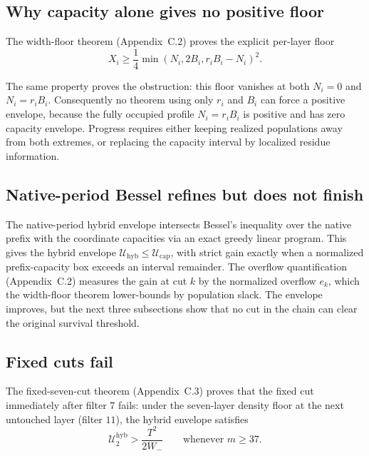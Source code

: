 \subsection{Why capacity alone gives no positive floor}
\label{sec:capacity-no-positive-floor}

The width-floor theorem (Appendix~C.2) proves the explicit per-layer floor
\begin{equation*}
X_i\ge\frac14\min(N_i,2B_i,r_iB_i-N_i)^2.
\end{equation*}

The same property proves the obstruction: this floor vanishes at both
$N_i=0$ and $N_i=r_iB_i$. Consequently no theorem using only $r_i$ and $B_i$
can force a positive envelope, because the fully occupied profile $N_i=r_iB_i$
is positive and has zero capacity envelope. Progress requires either keeping
realized populations away from both extremes, or replacing the capacity
interval by localized residue information.

\subsection{Native-period Bessel refines but does not finish}
\label{sec:native-period-bessel}

The native-period hybrid envelope intersects Bessel's inequality over the
native prefix with the coordinate capacities via an exact greedy linear
program. This gives the hybrid envelope
$\mathcal U_{\mathrm{hyb}}\le\mathcal U_{\mathrm{cap}}$, with strict gain
exactly when a normalized prefix-capacity box exceeds an interval remainder.
The overflow quantification (Appendix~C.2) measures the gain at cut $k$ by
the normalized overflow $e_k$, which the width-floor theorem lower-bounds by
population slack. The envelope improves, but the next three subsections show
that no cut in the chain can clear the original survival threshold.

\subsection{Fixed cuts fail}
\label{sec:fixed-cuts-fail}

The fixed-seven-cut theorem (Appendix~C.3) proves that the fixed cut
immediately after filter $7$ fails: under the seven-layer density floor at
the next untouched layer (filter $11$), the hybrid envelope satisfies
\begin{equation*}
\mathcal U_2^{\mathrm{hyb}}>\frac{T^2}{2W_-}
\qquad\text{whenever }m\ge37.
\end{equation*}

